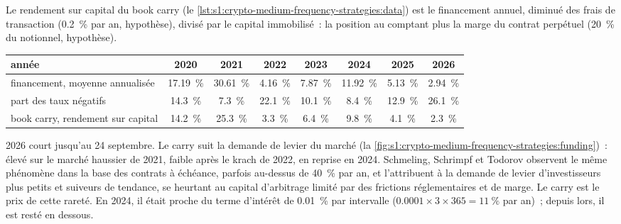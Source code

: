 Le rendement sur capital du book carry (le \cref{lst:s1:crypto-medium-frequency-strategies:data}) est le financement annuel, diminué des frais de transaction (0.2~\% par an,
hypothèse), divisé par le capital immobilisé~: la position au comptant plus la marge du contrat perpétuel (20~\% du notionnel, hypothèse).

\begin{center}
\small
\begin{tabular}{@{}lccccccc@{}}
\toprule
année & 2020 & 2021 & 2022 & 2023 & 2024 & 2025 & 2026\\
\midrule
financement, moyenne annualisée & 17.19~\% & 30.61~\% & 4.16~\% & 7.87~\% & 11.92~\% & 5.13~\% & 2.94~\%\\
part des taux négatifs & 14.3~\% & 7.3~\% & 22.1~\% & 10.1~\% & 8.4~\% & 12.9~\% & 26.1~\%\\
book carry, rendement sur capital & 14.2~\% & 25.3~\% & 3.3~\% & 6.4~\% & 9.8~\% & 4.1~\% & 2.3~\%\\
\bottomrule
\end{tabular}
\end{center}

2026 court jusqu'au 24 septembre. Le carry suit la demande de levier du marché (la \cref{fig:s1:crypto-medium-frequency-strategies:funding})~: élevé sur le
marché haussier de 2021, faible après le krach de 2022, en reprise en 2024. Schmeling, Schrimpf et Todorov observent le même phénomène dans la base des contrats à échéance, parfois
au-dessus de 40~\% par an, et l'attribuent à la demande de levier d'investisseurs plus petits et suiveurs de tendance, se heurtant au capital d'arbitrage limité par des
frictions réglementaires et de marge. Le carry est le prix de cette rareté. En 2024, il était proche du terme d'intérêt de 0.01~\% par intervalle ($0.0001 \times 3 \times 365 = 11~\%$ par
an)~; depuis lors, il est resté en dessous.

